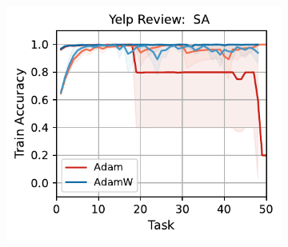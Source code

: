 \begin{figure}[htb!]
{\begin{figure}[t]
{        \includegraphics[width=\textwidth]{figs/Accuracy/nlp/attention/yelp_review_full_40.pdf}
    }
    \\
\end{figure}}
\end{figure}
